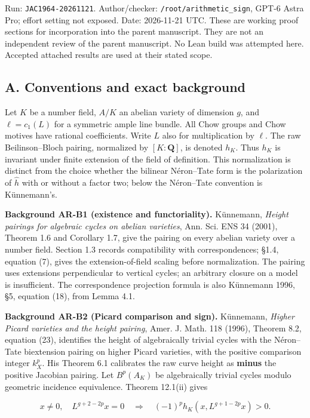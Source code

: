 \documentclass[11pt,a4paper]{article}
\begin{document}
Run: \texttt{JAC1964-20261121}. Author/checker:
\texttt{/root/arithmetic\_sign}, GPT-6 Astra Pro; effort setting not
exposed. Date: 2026-11-21 UTC. These are working proof sections for
incorporation into the parent manuscript. They are not an independent
review of the parent manuscript. No Lean build was attempted here.
Accepted attached results are used at their stated scope.

\subsection{A. Conventions and exact
background}\label{a.-conventions-and-exact-background}

Let \(K\) be a number field, \(A/K\) an abelian variety of dimension
\(g\), and \(\ell=c_1(L)\) for a symmetric ample line bundle. All Chow
groups and Chow motives have rational coefficients. Write \(L\) also for
multiplication by \(\ell\). The raw Beilinson--Bloch pairing, normalized
by \([K:\mathbf Q]\), is denoted \(h_K\). Thus \(h_K\) is invariant
under finite extension of the field of definition. This normalization is
distinct from the choice whether the bilinear Néron--Tate form is the
polarization of \(\widehat h\) with or without a factor two; below the
Néron--Tate convention is Künnemann's.

\textbf{Background AR-B1 (existence and functoriality).} Künnemann,
\emph{Height pairings for algebraic cycles on abelian varieties}, Ann.
Sci. ENS 34 (2001), Theorem 1.6 and Corollary 1.7, give the pairing on
every abelian variety over a number field. Section 1.3 records
compatibility with correspondences; §1.4, equation (7), gives the
extension-of-field scaling before normalization. The pairing uses
extensions perpendicular to vertical cycles; an arbitrary closure on a
model is insufficient. The correspondence projection formula is also
Künnemann 1996, §5, equation (18), from Lemma 4.1.

\textbf{Background AR-B2 (Picard comparison and sign).} Künnemann,
\emph{Higher Picard varieties and the height pairing}, Amer. J. Math.
118 (1996), Theorem 8.2, equation (23), identifies the height of
algebraically trivial cycles with the Néron--Tate biextension pairing on
higher Picard varieties, with the positive comparison integer \(k_X^p\).
His Theorem 6.1 calibrates the raw curve height as \textbf{minus} the
positive Jacobian pairing. Let \(B^p(A_K)\) be algebraically trivial
cycles modulo geometric incidence equivalence. Theorem 12.1(ii) gives

\[
 x\ne0,\quad L^{g+2-2p}x=0
 \quad\Longrightarrow\quad
 (-1)^p h_K(x,L^{g+1-2p}x)>0.
\]
\end{document}
